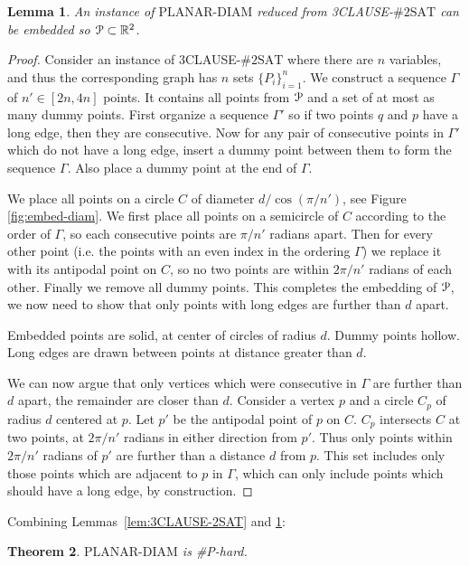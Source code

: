 \documentclass{journal}
\newcommand{\Eu}[1]{\ensuremath{\EuScript{#1}}}
\newcommand{\R}{\ensuremath{\mathbb{R}}}
\newcommand{\PDIAM}{$\ensuremath{\textrm{PLANAR-DIAM}}$\xspace}
\newcommand{\twoSAT}{$\ensuremath{\textrm{\#2SAT}}$\xspace}
\newtheorem {theorem}{Theorem}[section]
\newtheorem {lemma}[theorem]{Lemma}
\begin{document}
\begin{lemma}
\label{lem:embed-DIAM}
An instance of \PDIAM reduced from 3CLAUSE-\twoSAT can be embedded so $\Eu{P} \subset \R^2$.
\end{lemma}
\begin{proof}

Consider an instance of 3CLAUSE-\twoSAT where there are $n$ variables, and thus the corresponding graph has $n$ sets $\{P_i\}_{i=1}^n$.  We construct a sequence $\Gamma$ of $n' \in [2n,4n]$ points.
It contains all points from $\Eu{P}$ and a set of at most as many dummy points.
First organize a sequence $\Gamma'$ so if two points $q$ and $p$ have a long edge, then they are consecutive.  Now for any pair of consecutive points in $\Gamma'$ which do not have a long edge, insert a dummy point between them to form the sequence $\Gamma$.  Also place a dummy point at the end of $\Gamma$.

We place all points on a circle $C$ of diameter $d/\cos(\pi / n')$, see Figure \ref{fig:embed-diam}.
We first place all points on a semicircle of $C$ according to the order of $\Gamma$, so each consecutive points are $\pi/n'$ radians apart.  Then for every other point (i.e. the points with an even index in the ordering $\Gamma$) we replace it with its antipodal point on $C$, so no two points are within $2\pi/n'$ radians of each other.  Finally we remove all dummy points.
This completes the embedding of $\Eu{P}$, we now need to show that only points with long edges are further than $d$ apart.

{Embedded points are solid, at center of circles of radius $d$.  Dummy points hollow. Long edges are drawn between points at distance greater than $d$.}

We can now argue that only vertices which were consecutive in $\Gamma$ are further than $d$ apart, the remainder are closer than $d$.  Consider a vertex $p$ and a circle $C_p$ of radius $d$ centered at $p$.  Let $p'$ be the antipodal point of $p$ on $C$.  $C_p$ intersects $C$ at two points, at $2\pi/n'$ radians in either direction from $p'$.  Thus only points within $2\pi/n'$ radians of $p'$ are further than a distance $d$ from $p$.  This set includes only those points which are adjacent to $p$ in $\Gamma$, which can only include points which should have a long edge, by construction.  
\end{proof}

Combining Lemmas~\ref {lem:3CLAUSE-2SAT} and \ref {lem:embed-DIAM}: 
\begin{theorem}
\PDIAM is \#P-hard.
\end{theorem}
\end{document}
